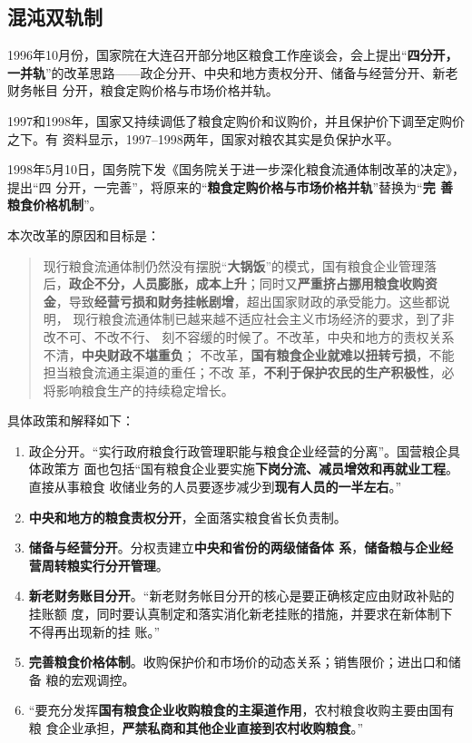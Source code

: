 
\subsection{混沌双轨制}

1996年10月份，国家院在大连召开部分地区粮食工作座谈会，会上提出“\textbf{四分开，
  一并轨}”的改革思路——政企分开、中央和地方责权分开、储备与经营分开、新老财务帐目
分开，粮食定购价格与市场价格并轨。

1997和1998年，国家又持续调低了粮食定购价和议购价，并且保护价下调至定购价之下。有
资料显示，1997--1998两年，国家对粮农其实是负保护水平。

1998年5月10日，国务院下发《国务院关于进一步深化粮食流通体制改革的决定》，提出“四
分开，一完善”，将原来的“\textbf{粮食定购价格与市场价格并轨}”替换为“\textbf{完
  善粮食价格机制}”。

本次改革的原因和目标是：
\begin{quotation}
  现行粮食流通体制仍然没有摆脱“\textbf{大锅饭}”的模式，国有粮食企业管理落
  后，\textbf{政企不分，人员膨胀，成本上升}；同时又\textbf{严重挤占挪用粮食收购资
    金}，导致\textbf{经营亏损和财务挂帐剧增}，超出国家财政的承受能力。这些都说明，
  现行粮食流通体制已越来越不适应社会主义市场经济的要求，到了非改不可、不改不行、
  刻不容缓的时候了。不改革，中央和地方的责权关系不清，\textbf{中央财政不堪重负}；
  不改革，\textbf{国有粮食企业就难以扭转亏损}，不能担当粮食流通主渠道的重任；不改
  革，\textbf{不利于保护农民的生产积极性}，必将影响粮食生产的持续稳定增长。
\end{quotation}

具体政策和解释如下：
\begin{enumerate}
\item 政企分开。“实行政府粮食行政管理职能与粮食企业经营的分离”。国营粮企具体政策方
  面也包括“国有粮食企业要实施\textbf{下岗分流、减员增效和再就业工程}。直接从事粮食
  收储业务的人员要逐步减少到\textbf{现有人员的一半左右}。”

\item \textbf{中央和地方的粮食责权分开}，全面落实粮食省长负责制。

\item \textbf{储备与经营分开}。分权责建立\textbf{中央和省份的两级储备体
    系}，\textbf{储备粮与企业经营周转粮实行分开管理}。

\item \textbf{新老财务账目分开}。“新老财务帐目分开的核心是要正确核定应由财政补贴的挂账额
  度，同时要认真制定和落实消化新老挂账的措施，并要求在新体制下不得再出现新的挂
  账。”\cite{caobaoming01}

\item \textbf{完善粮食价格体制}。收购保护价和市场价的动态关系；销售限价；进出口和储备
  粮的宏观调控。

\item “要充分发挥\textbf{国有粮食企业收购粮食的主渠道作用}，农村粮食收购主要由国有粮
  食企业承担，\textbf{严禁私商和其他企业直接到农村收购粮食}。”
\end{enumerate}

